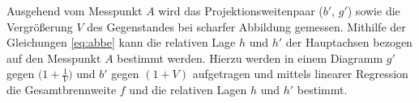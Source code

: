 Ausgehend vom Messpunkt $A$ wird das Projektionsweitenpaar ($b'$, $g'$) sowie die Vergrößerung $V$ des Gegenstandes bei scharfer Abbildung gemessen. Mithilfe der Gleichungen \eqref{eq:abbe} kann die relativen Lage $h$ und $h'$ der Hauptachsen bezogen auf den Messpunkt $A$ bestimmt werden.
Hierzu werden in einem Diagramm $g′$ gegen $\bigl(1+\frac{1}{V}\bigr)$ und $b′$ gegen $(1+V)$ aufgetragen und mittels linearer Regression die Gesamtbrennweite $f$ und die relativen Lagen $h$ und $h'$ bestimmt.